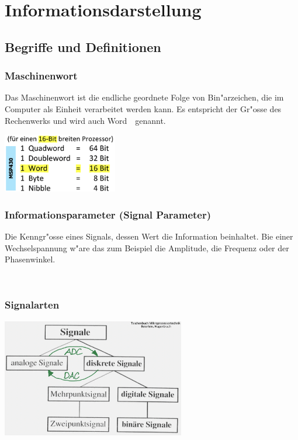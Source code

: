 \section{Informationsdarstellung}
\subsection{Begriffe und Definitionen}

\begin{minipage}[t]{9cm}
	\subsubsection{Maschinenwort}
	Das Maschinenwort ist die endliche geordnete Folge von Bin"arzeichen, die im Computer als Einheit verarbeitet werden kann. Es entspricht der Gr"osse des Rechenwerks und wird auch \dq Word\dq \ \ genannt.
	
	\includegraphics[width = 5cm]{pics/Wortlaenge}

	\subsubsection{Informationsparameter (Signal Parameter)}
	Die Kenngr"osse eines Signals, dessen Wert die Information beinhaltet.
	Bie einer Wechselspannung w"are das zum Beispiel die Amplitude, die Frequenz oder der Phasenwinkel.

\end{minipage}
%
\begin{minipage}{0.5cm}
	\ \
\end{minipage}
%
\begin{minipage}[t]{9cm}
	\subsubsection{Signalarten}
	\includegraphics[width=8cm]{pics/Signalarten}
\end{minipage}

